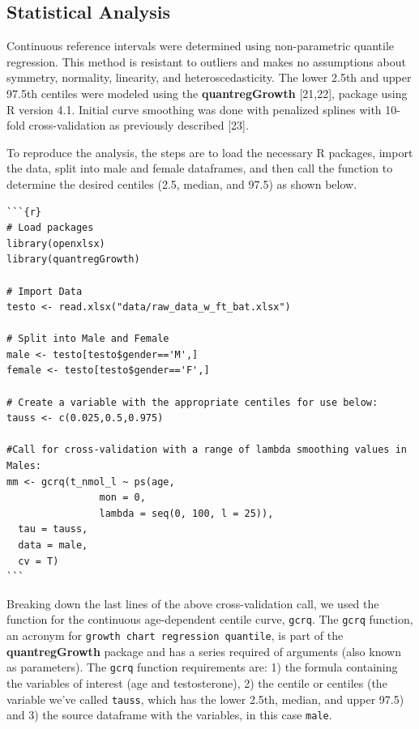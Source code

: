 \documentclass[]{elsarticle} %
\begin{document}
\hypertarget{statistical-analysis}{%
\subsection{Statistical Analysis}\label{statistical-analysis}}

Continuous reference intervals were determined using non-parametric
quantile regression. This method is resistant to outliers and makes no
assumptions about symmetry, normality, linearity, and
heteroscedasticity. The lower 2.5th and upper 97.5th centiles were
modeled using the \textbf{quantregGrowth} {[}21,22{]}, package using R
version 4.1. Initial curve smoothing was done with penalized splines
with 10-fold cross-validation as previously described {[}23{]}.

To reproduce the analysis, the steps are to load the necessary R
packages, import the data, split into male and female dataframes, and
then call the function to determine the desired centiles (2.5, median,
and 97.5) as shown below.

\begin{verbatim}
```{r}
# Load packages
library(openxlsx)
library(quantregGrowth)

# Import Data
testo <- read.xlsx("data/raw_data_w_ft_bat.xlsx")

# Split into Male and Female 
male <- testo[testo$gender=='M',]
female <- testo[testo$gender=='F',]

# Create a variable with the appropriate centiles for use below: 
tauss <- c(0.025,0.5,0.975)

#Call for cross-validation with a range of lambda smoothing values in Males:
mm <- gcrq(t_nmol_l ~ ps(age,
                mon = 0,
                lambda = seq(0, 100, l = 25)),
  tau = tauss,
  data = male,
  cv = T)
```
\end{verbatim}

Breaking down the last lines of the above cross-validation call, we used
the function for the continuous age-dependent centile curve,
\texttt{gcrq}. The \texttt{gcrq} function, an acronym for
\texttt{growth\ chart\ regression\ quantile}, is part of the
\textbf{quantregGrowth} package and has a series required of arguments
(also known as parameters). The \texttt{gcrq} function requirements are:
1) the formula containing the variables of interest (age and
testosterone), 2) the centile or centiles (the variable we've called
\texttt{tauss}, which has the lower 2.5th, median, and upper 97.5) and
3) the source dataframe with the variables, in this case \texttt{male}.
\end{document}
